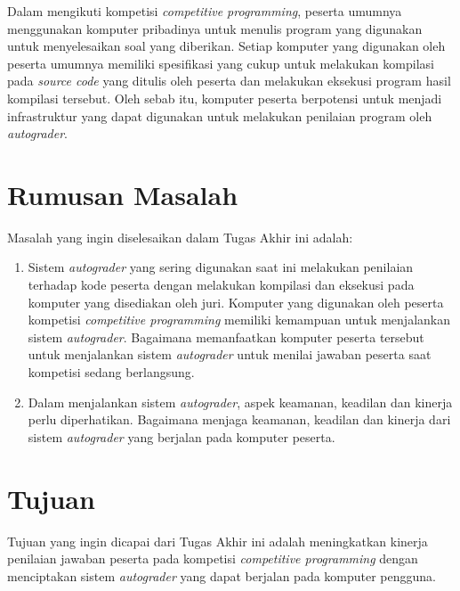 \par Dalam mengikuti kompetisi \textit{competitive programming}, peserta umumnya menggunakan komputer pribadinya untuk menulis program yang digunakan untuk menyelesaikan soal yang diberikan. Setiap komputer yang digunakan oleh peserta umumnya memiliki spesifikasi yang cukup untuk melakukan kompilasi pada \textit{source code} yang ditulis oleh peserta dan melakukan eksekusi program hasil kompilasi tersebut. Oleh sebab itu, komputer peserta berpotensi untuk menjadi infrastruktur yang dapat digunakan untuk melakukan penilaian program oleh \textit{autograder}.

\section{Rumusan Masalah}

\par Masalah yang ingin diselesaikan dalam Tugas Akhir ini adalah:
\begin{enumerate}

	\item Sistem \textit{autograder} yang sering digunakan saat ini melakukan penilaian terhadap kode peserta dengan melakukan kompilasi dan eksekusi pada komputer yang disediakan oleh juri. Komputer yang digunakan oleh peserta kompetisi \textit{competitive programming} memiliki kemampuan untuk menjalankan sistem \textit{autograder}. Bagaimana memanfaatkan komputer peserta tersebut untuk menjalankan sistem \textit{autograder} untuk menilai jawaban peserta saat kompetisi sedang berlangsung.
	
	\item Dalam menjalankan sistem \textit{autograder}, aspek keamanan, keadilan dan kinerja perlu diperhatikan. Bagaimana menjaga keamanan, keadilan dan kinerja dari sistem \textit{autograder} yang berjalan pada komputer peserta.

\end{enumerate}

\section{Tujuan}

\par Tujuan yang ingin dicapai dari Tugas Akhir ini adalah meningkatkan kinerja penilaian jawaban peserta pada kompetisi \textit{competitive programming} dengan menciptakan sistem \textit{autograder} yang dapat berjalan pada komputer pengguna.

